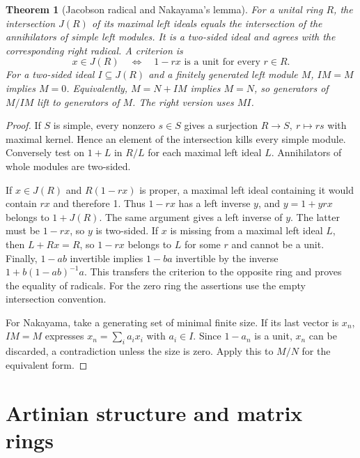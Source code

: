 \documentclass[11pt,oneside,openany]{book}
\newtheorem{theorem}{Theorem}[chapter]
\theoremstyle{definition}
\theoremstyle{remark}
\begin{document}
\begin{theorem}[Jacobson radical and Nakayama's lemma]
\label{p103:ALG-03-C03-R02}
For a unital ring \(R\), the intersection \(J(R)\) of its maximal
left ideals equals the intersection of the annihilators of simple
left modules. It is a two-sided ideal and agrees with the
corresponding right radical. A criterion is
\[
 x\in J(R)\quad\Longleftrightarrow\quad
             1-rx\text{ is a unit for every }r\in R.
\]
For a two-sided ideal \(I\subseteq J(R)\) and a finitely generated
left module \(M\), \(IM=M\) implies \(M=0\). Equivalently,
\(M=N+IM\) implies \(M=N\), so generators of \(M/IM\) lift to
generators of \(M\). The right version uses \(MI\).
\end{theorem}
\begin{proof}
If \(S\) is simple, every nonzero \(s\in S\) gives a surjection
\(R\to S,\ r\mapsto rs\) with maximal kernel. Hence an element of
the intersection kills every simple module. Conversely test on
\(1+L\) in \(R/L\) for each maximal left ideal \(L\).
Annihilators of whole modules are two-sided.

If \(x\in J(R)\) and \(R(1-rx)\) is proper, a maximal left
ideal containing it would contain \(rx\) and therefore 1.
Thus \(1-rx\) has a left inverse \(y\), and
\(y=1+yrx\) belongs to \(1+J(R)\). The same argument gives a
left inverse of \(y\). The latter must be \(1-rx\), so \(y\)
is two-sided. If \(x\) is missing from a maximal left ideal \(L\),
then \(L+Rx=R\), so \(1-rx\) belongs to \(L\) for some \(r\)
and cannot be a unit. Finally, \(1-ab\) invertible implies
\(1-ba\) invertible by the inverse \(1+b(1-ab)^{-1}a\).
This transfers the criterion to the opposite ring and proves
the equality of radicals. For the zero ring the assertions use
the empty intersection convention.

For Nakayama, take a generating set of minimal finite size.
If its last vector is \(x_n\), \(IM=M\) expresses
\(x_n=\sum_i a_i x_i\) with \(a_i\in I\).
Since \(1-a_n\) is a unit, \(x_n\) can be discarded, a
contradiction unless the size is zero. Apply this to \(M/N\)
for the equivalent form.
\end{proof}

\section{Artinian structure and matrix rings}
\end{document}
